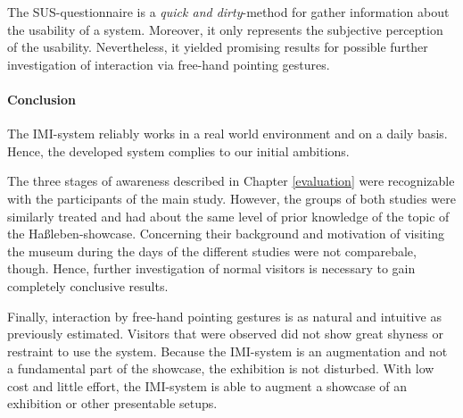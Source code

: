 The \ac{SUS}-questionnaire is a \textit{quick and dirty}-method for gather information about the usability of a system. Moreover, it only represents the subjective perception of the usability. Nevertheless, it yielded promising results for possible further investigation of interaction via free-hand pointing gestures. 


\paragraph{Conclusion}

The \ac{IMI}-system reliably works in a real world environment and on a daily basis. Hence, the developed system complies to our initial ambitions.

The three stages of awareness described in Chapter \ref{evaluation} were recognizable with the participants of the main study. However, the groups of both studies were similarly treated and had about the same level of prior knowledge of the topic of the Haßleben-showcase. Concerning their background and motivation of visiting the museum during the days of the different studies were not comparebale, though. Hence, further investigation of normal visitors is necessary to gain completely conclusive results.

Finally, interaction by free-hand pointing gestures is as natural and intuitive as previously estimated. Visitors that were observed did not show great shyness or restraint to use the system. Because the \ac{IMI}-system is an augmentation and not a fundamental part of the showcase, the exhibition is not disturbed. With low cost and little effort, the \ac{IMI}-system is able to augment a showcase of an exhibition or other presentable setups.

%
